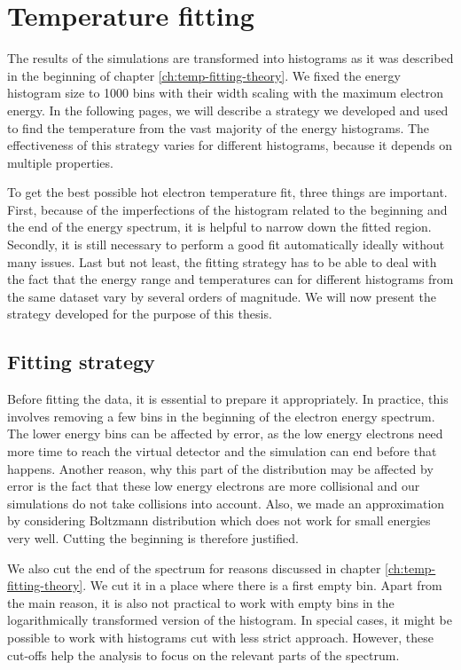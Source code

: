 \section{Temperature fitting}
The results of the simulations are transformed into histograms as it was described in the beginning of chapter \ref{ch:temp-fitting-theory}. We fixed the energy histogram size to 1000 bins with their width scaling with the maximum electron energy. In the following pages, we will describe a strategy we developed and used to find the temperature from the vast majority of the energy histograms. The effectiveness of this strategy varies for different histograms, because it depends on multiple properties.

To get the best possible hot electron temperature fit, three things are important. First, because of the imperfections of the histogram related to the beginning and the end of the energy spectrum, it is helpful to narrow down the fitted region. Secondly, it is still necessary to perform a good fit automatically ideally without many issues. Last but not least, the fitting strategy has to be able to deal with the fact that the energy range and temperatures can for different histograms from the same dataset vary by several orders of magnitude. We will now present the strategy developed for the purpose of this thesis.


\subsection*{Fitting strategy}
Before fitting the data, it is essential to prepare it appropriately. In practice, this involves removing a few bins in the beginning of the electron energy spectrum. The lower energy bins can be affected by error, as the low energy electrons need more time to reach the virtual detector and the simulation can end before that happens. Another reason, why this part of the distribution may be affected by error is the fact that these low energy electrons are more collisional and our simulations do not take collisions into account. Also, we made an approximation by considering Boltzmann distribution which does not work for small energies very well. Cutting the beginning is therefore justified. 

We also cut the end of the spectrum for reasons discussed in chapter \ref{ch:temp-fitting-theory}. We cut it in a place where there is a first empty bin. Apart from the main reason, it is also not practical to work with empty bins in the logarithmically transformed version of the histogram. In special cases, it might be possible to work with histograms cut with less strict approach. However, these cut-offs help the analysis to focus on the relevant parts of the spectrum.


